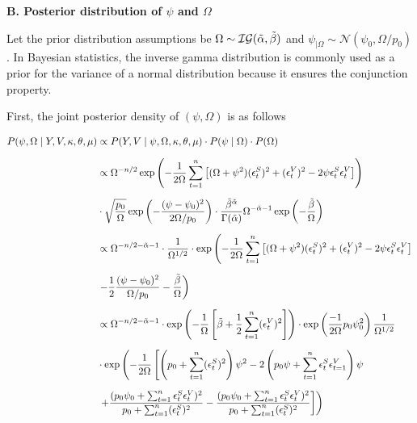 \documentclass[12pt,a4paper]{article}
\numberwithin{equation}{section}
\begin{document}
\vspace{1em}

\textbf{B. Posterior distribution of $\psi$ and $\Omega$}
\vspace{1em}

Let the prior distribution assumptions be $\Omega\sim \mathcal{IG}(\Tilde{\alpha}, \Tilde{\beta})$ and $\psi_{|\Omega} \sim \mathcal{N}(\psi_0, \Omega/p_0)$. In Bayesian statistics, the inverse gamma distribution is commonly used as a prior for the variance of a normal distribution because it ensures the conjunction property.

First, the joint posterior density of $(\psi,\Omega)$ is as follows

\begin{align*}
P(\psi, \Omega \mid Y, V, \kappa, \theta, \mu) &\propto P(Y, V \mid \psi, \Omega, \kappa, \theta, \mu) \cdot P(\psi \mid \Omega) \cdot P(\Omega) \\[0.6em]
& \propto \Omega^{-n/2} \exp\left( -\frac{1}{2\Omega} \sum_{t=1}^{n} \left[ (\Omega + \psi^2)(\epsilon_t^S)^2 + (\epsilon_t^V)^2 - 2\psi \epsilon_t^S \epsilon_t^V \right] \right) \\[0.6em]
& \cdot \sqrt{\frac{p_0}{\Omega}} \exp\left( -\frac{(\psi - \psi_0)^2}{2\Omega/p_0} \right) \cdot \frac{\tilde{\beta}^{\tilde{\alpha}}}{\Gamma(\tilde{\alpha})} \Omega^{-\tilde{\alpha}-1} \exp\left( -\frac{\tilde{\beta}}{\Omega} \right) \\[0.6em]
& \propto \Omega^{-n/2 - \tilde{\alpha} - 1} \cdot \frac{1}{\Omega^{1/2}} \cdot \exp\left( -\frac{1}{2\Omega} \sum_{t=1}^{n} \left[ (\Omega + \psi^2)(\epsilon_t^S)^2 + (\epsilon_t^V)^2 - 2\psi \epsilon_t^S \epsilon_t^V \right] \right. \\[0.6em]
& \left. - \frac{1}{2} \frac{(\psi - \psi_0)^2}{\Omega/p_0} - \frac{\tilde{\beta}}{\Omega} \right)\\[0.6em]
&\propto \Omega^{-n/2-\Tilde{\alpha}-1} \cdot \exp \left( -\frac{1}{\Omega} \left[\Tilde{\beta} + \frac{1}{2}\sum_{t=1}^n (\epsilon_t^V)^2\right]\right) \cdot \exp \left(\frac{-1}{2\Omega}p_0\psi_0^2\right)\frac{1}{\Omega^{1/2}}\\[0.6em]
&\cdot \exp \left( -\frac{1}{2 \Omega} \left[ \left( p_0 + \sum_{t=1}^n (\epsilon_t^S)^2 \right) \psi^2 -2 \left(p_0 \psi + \sum_{t=1}^n \epsilon_t^S \epsilon_{t=1}^V \right) \psi \right. \right.\\[0.6em]
&\left. \left. + \frac{(p_0 \psi_0 + \sum_{t=1}^n \epsilon_t^S \epsilon_t^V )^2 }{p_0 + \sum_{t=1}^n (\epsilon_t^S )^2 } - \frac{(p_0 \psi_0 + \sum_{t=1}^n \epsilon_t^S \epsilon_t^V )^2 }{p_0 + \sum_{t=1}^n (\epsilon_t^S )^2 }\right]\right)
\end{align*}
\end{document}
